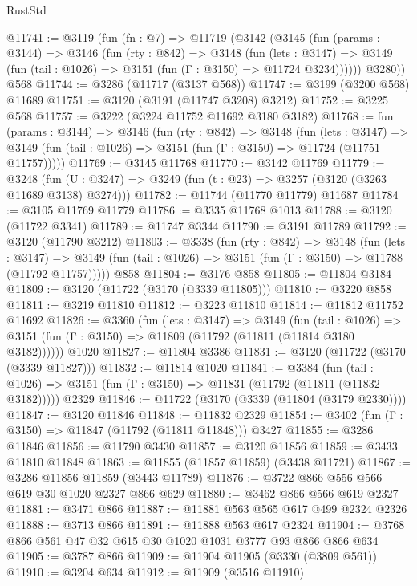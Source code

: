 \begin{lexlean}{RustStd}
\begin{coremodule}
@11741 := @3119
    (fun (fn : @7) =>
    @11719
      (@3142
        (@3145
          (fun (params : @3144) =>
          @3146
            (fun (rty : @842) =>
            @3148
              (fun (lets : @3147) =>
              @3149 (fun (tail : @1026) => @3151 (fun (Γ : @3150) => @11724 @3234))))))
        @3280))
    @568
@11744 := @3286 (@11717 (@3137 @568))
@11747 := @3199 (@3200 @568) @11689
@11751 := @3120 (@3191 (@11747 @3208) @3212)
@11752 := @3225 @568
@11757 := @3222 (@3224 @11752 @11692 @3180 @3182)
@11768 := fun (params : @3144) =>
  @3146
    (fun (rty : @842) =>
    @3148
      (fun (lets : @3147) =>
      @3149 (fun (tail : @1026) => @3151 (fun (Γ : @3150) => @11724 (@11751 @11757)))))
@11769 := @3145 @11768
@11770 := @3142 @11769
@11779 := @3248
    (fun (U : @3247) => @3249 (fun (t : @23) => @3257 (@3120 (@3263 @11689 @3138) @3274)))
@11782 := @11744 (@11770 @11779) @11687
@11784 := @3105 @11769 @11779
@11786 := @3335 @11768 @1013
@11788 := @3120 (@11722 @3341)
@11789 := @11747 @3344
@11790 := @3191 @11789
@11792 := @3120 (@11790 @3212)
@11803 := @3338
    (fun (rty : @842) =>
    @3148
      (fun (lets : @3147) =>
      @3149 (fun (tail : @1026) => @3151 (fun (Γ : @3150) => @11788 (@11792 @11757)))))
    @858
@11804 := @3176 @858
@11805 := @11804 @3184
@11809 := @3120 (@11722 (@3170 (@3339 @11805)))
@11810 := @3220 @858
@11811 := @3219 @11810
@11812 := @3223 @11810
@11814 := @11812 @11752 @11692
@11826 := @3360
    (fun (lets : @3147) =>
    @3149
      (fun (tail : @1026) =>
      @3151 (fun (Γ : @3150) => @11809 (@11792 (@11811 (@11814 @3180 @3182))))))
    @1020
@11827 := @11804 @3386
@11831 := @3120 (@11722 (@3170 (@3339 @11827)))
@11832 := @11814 @1020
@11841 := @3384
    (fun (tail : @1026) => @3151 (fun (Γ : @3150) => @11831 (@11792 (@11811 (@11832 @3182)))))
    @2329
@11846 := @11722 (@3170 (@3339 (@11804 (@3179 @2330))))
@11847 := @3120 @11846
@11848 := @11832 @2329
@11854 := @3402 (fun (Γ : @3150) => @11847 (@11792 (@11811 @11848))) @3427
@11855 := @3286 @11846
@11856 := @11790 @3430
@11857 := @3120 @11856
@11859 := @3433 @11810 @11848
@11863 := @11855 (@11857 @11859) (@3438 @11721)
@11867 := @3286 @11856 @11859 (@3443 @11789)
@11876 := @3722 @866 @556 @566 @619 @30 @1020 @2327 @866 @629
@11880 := @3462 @866 @566 @619 @2327
@11881 := @3471 @866
@11887 := @11881 @563 @565 @617 @499 @2324 @2326
@11888 := @3713 @866
@11891 := @11888 @563 @617 @2324
@11904 := @3768 @866 @561 @47 @32 @615 @30 @1020 @1031 @3777 @93 @866 @866 @634
@11905 := @3787 @866
@11909 := @11904 @11905 (@3330 (@3809 @561))
@11910 := @3204 @634
@11912 := @11909 (@3516 @11910)

\end{coremodule}
\end{lexlean}
